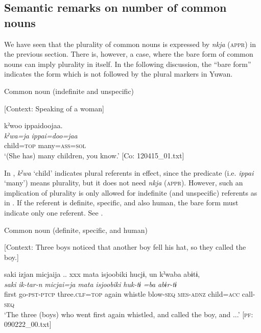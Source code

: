 \subsection{Semantic remarks on number of common nouns}

We have seen that the plurality of common nouns is expressed by \textit{nkja} (\textsc{appr}) in the previous section. There is, however, a case, where the bare form of common nouns can imply plurality in itself. In the following discussion, the “bare form” indicates the form which is not followed by the plural markers in Yuwan.

\ea \label{ex:7:4}  Common noun (indefinite and unspecific)

  [Context: Speaking of a woman]

{\TM}
\glll  kˀwoo  ippaidoojaa.\\
\textit{kˀwa=ja}  \textit{ippai=doo=jaa}\\
child=\textsc{top}  many=\textsc{ass}=\textsc{sol}\\
\glt ‘(She has) many children, you know.’ [Co: 120415\_01.txt]

\z

In , \textit{kˀwa} ‘child’ indicates plural referents in effect, since the predicate (i.e. \textit{ippai} ‘many’) means plurality, but it does not need \textit{nkja} (\textsc{appr}). However, such an implication of plurality is only allowed for indefinite (and unspecific) referents as in . If the referent is definite, specific, and also human, the bare form must indicate only one referent. See .

\ea \label{ex:7:5}  Common noun (definite, specific, and human)

  [Context: Three boys noticed that another boy fell his hat, so they called the boy.]

{\TM}
\glll saki  izjan  micjaija ..  xxx  mata  isjoobiki  hucjɨ,  un  kˀwaba  abɨtɨ,\\
\textit{saki}  \textit{ik-tar-n}  \textit{micjai=ja}    \textit{mata}  \textit{isjoobiki}  \textit{huk-tɨ}  \textit{}  \textit{=ba}  \textit{abɨr-tɨ}\\
    first  go-\textsc{pst}-\textsc{ptcp}  three.\textsc{clf}=\textsc{top}    again  whistle  blow-\textsc{seq}  \textsc{mes}-\textsc{adnz}  child=\textsc{acc}  call-\textsc{seq}\\
\glt    ‘The three (boys) who went first again whistled, and called the boy, and ...’ [\textsc{pf}: 090222\_00.txt]

